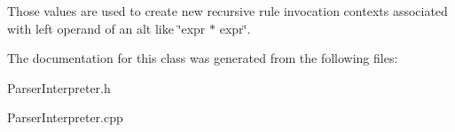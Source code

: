 Those values are used to create new recursive rule invocation contexts associated with left operand of an alt like \char`\"{}expr \textquotesingle{}$\ast$\textquotesingle{} expr\char`\"{}. 

The documentation for this class was generated from the following files\+:\begin{DoxyCompactItemize}
\item 
Parser\+Interpreter.\+h\item 
Parser\+Interpreter.\+cpp\end{DoxyCompactItemize}
